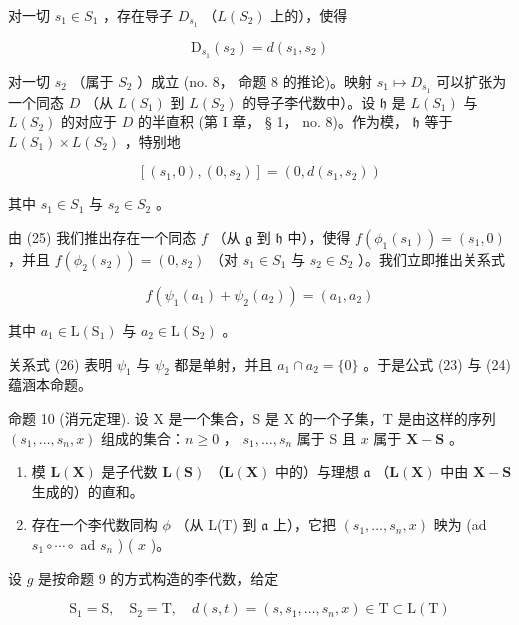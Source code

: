 对一切 \(s_1 \in S_1\) ，存在导子 \(D_{s_1}\) （\(L(S_2)\) 上的），使得

\[
\mathrm{D} _ {s _ {1}} (s _ {2}) = d (s _ {1}, s _ {2})
\]

对一切 \(s_2\) （属于 \(S_2\) ）成立 (no. 8， 命题 8 的推论)。映射 \(s_1 \mapsto D_{s_1}\) 可以扩张为一个同态 \(D\) （从 \(L(S_1)\) 到 \(L(S_2)\) 的导子李代数中）。设 \(\mathfrak{h}\) 是 \(L(S_1)\) 与 \(L(S_2)\) 的对应于 \(D\) 的半直积 (第 I 章， § 1， no. 8)。作为模， \(\mathfrak{h}\) 等于 \(L(S_1) \times L(S_2)\) ，特别地

\[
[ (s _ {1}, 0), (0, s _ {2}) ] = (0, d (s _ {1}, s _ {2}))\tag{25}
\]

其中 \(s_{1} \in S_{1}\) 与 \(s_{2} \in S_{2}\) 。

由 (25) 我们推出存在一个同态 \(f\) （从 \(\mathfrak{g}\) 到 \(\mathfrak{h}\) 中），使得 \(f(\phi_1(s_1)) = (s_1, 0)\) ，并且 \(f(\phi_2(s_2)) = (0, s_2)\) （对 \(s_1 \in S_1\) 与 \(s_2 \in S_2\) ）。我们立即推出关系式

\[
f (\psi_ {1} (a _ {1}) + \psi_ {2} (a _ {2})) = (a _ {1}, a _ {2})\tag{26}
\]

其中 \(a_1 \in \mathrm{L}(\mathrm{S}_1)\) 与 \(a_2 \in \mathrm{L}(\mathrm{S}_2)\) 。

关系式 (26) 表明 \(\psi_{1}\) 与 \(\psi_{2}\) 都是单射，并且 \(a_{1} \cap a_{2} = \{0\}\) 。于是公式 (23) 与 (24) 蕴涵本命题。

命题 10 (消元定理). 设 X 是一个集合，S 是 X 的一个子集，T 是由这样的序列 \((s_1, \ldots, s_n, x)\) 组成的集合：\(n \geqslant 0\) ， \(s_1, \ldots, s_n\) 属于 S 且 \(x\) 属于 \(\mathbf{X} - \mathbf{S}\) 。

\begin{enumerate}
\def\labelenumi{(\alph{enumi})}
\item
  模 \(\mathbf{L}(\mathbf{X})\) 是子代数 \(\mathbf{L}(\mathbf{S})\) （\(\mathbf{L}(\mathbf{X})\) 中的）与理想 \(\mathfrak{a}\) （\(\mathbf{L}(\mathbf{X})\) 中由 \(\mathbf{X} - \mathbf{S}\) 生成的）的直和。
\item
  存在一个李代数同构 \(\phi\) （从 L(T) 到 \(\mathfrak{a}\) 上），它把 \((s_1, \ldots, s_n, x)\) 映为 (ad \(s_1 \circ \cdots \circ\) ad \(s_n\) ) ( \(x\) )。
\end{enumerate}

设 \(g\) 是按命题 9 的方式构造的李代数，给定

\[
\mathrm{S} _ {1} = \mathrm{S}, \quad \mathrm{S} _ {2} = \mathrm{T}, \quad d (s, t) = (s, s _ {1}, \dots , s _ {n}, x) \in \mathrm{T} \subset \mathrm{L} (\mathrm{T})
\]

